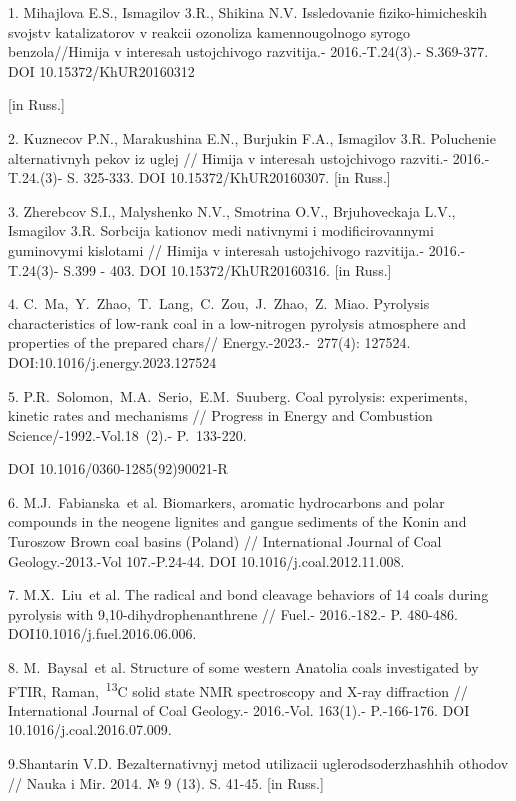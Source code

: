\begin{noparindent}
1. Mihajlova E.S., Ismagilov 3.R., Shikina N.V. Issledovanie
fiziko-himicheskih svojstv katalizatorov v reakcii ozonoliza
kamennougol\textquotesingle nogo syrogo benzola//Himija v interesah
ustojchivogo razvitija.- 2016.-T.24(3).- S.369-377. DOI
10.15372/KhUR20160312

{[}in Russ.{]}

2. Kuznecov P.N., Marakushina E.N., Burjukin F.A., Ismagilov 3.R.
Poluchenie al\textquotesingle ternativnyh pekov iz uglej // Himija v
interesah ustojchivogo razviti.- 2016.-T.24.(3)- S. 325-333. DOI
10.15372/KhUR20160307. {[}in Russ.{]}

3. Zherebcov S.I., Malyshenko N.V., Smotrina O.V., Brjuhoveckaja L.V.,
Ismagilov 3.R. Sorbcija kationov medi nativnymi i modificirovannymi
guminovymi kislotami // Himija v interesah ustojchivogo razvitija.-
2016.-T.24(3)- S.399 - 403. DOI 10.15372/KhUR20160316. {[}in Russ.{]}

4. C.~Ma,~Y.~Zhao,~T.~Lang,~C.~Zou,~J.~Zhao,~Z.~Miao. Pyrolysis
characteristics of low-rank coal in a low-nitrogen pyrolysis atmosphere
and properties of the prepared chars// Energy.-2023.-~277(4): 127524.
DOI:10.1016/j.energy.2023.127524

5. P.R.~Solomon,~M.A.~Serio,~E.M.~Suuberg. Coal pyrolysis: experiments,
kinetic rates and mechanisms // Progress in Energy and Combustion
Science/-1992.-Vol.18~(2).- P.~133-220.

DOI 10.1016/0360-1285(92)90021-R

6. M.J.~Fabianska\emph{~}et al. Biomarkers, aromatic hydrocarbons and
polar compounds in the neogene lignites and gangue sediments of the
Konin and Turoszow Brown coal basins (Poland) // International Journal
of Coal Geology.-2013.-Vol 107.-P.24-44. DOI 10.1016/j.coal.2012.11.008.

7. M.X.~Liu\emph{~}et al. The radical and bond cleavage behaviors of 14
coals during pyrolysis with 9,10-dihydrophenanthrene // Fuel.-
2016.-182.- P. 480-486. DOI10.1016/j.fuel.2016.06.006.

8. M.~Baysal\emph{~}et al. Structure of some western Anatolia coals
investigated by FTIR, Raman,~\textsuperscript{13}C solid state NMR
spectroscopy and X-ray diffraction // International Journal of Coal
Geology.- 2016.-Vol. 163(1).- P.-166-176. DOI
10.1016/j.coal.2016.07.009.

9.Shantarin V.D. Bezal\textquotesingle ternativnyj metod utilizacii
uglerodsoderzhashhih othodov // Nauka i Mir. 2014. № 9 (13). S. 41-45.
{[}in Russ.{]}


\end{noparindent}
